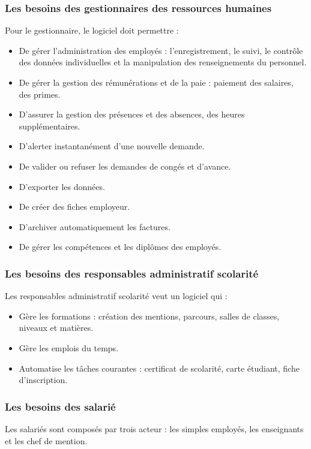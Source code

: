 \subsubsection{Les besoins des gestionnaires des ressources humaines}
Pour le gestionnaire, le logiciel doit permettre :
\begin{itemize}
	\item De gérer l'administration des employés : l'enregistrement, le suivi, le contrôle des données individuelles et la manipulation des renseignements du personnel.
	\item De gérer la gestion des rémunérations et de la paie : paiement des salaires, des primes.
	\item D'assurer la gestion des présences et des absences, des heures supplémentaires.
	\item D'alerter instantanément d'une nouvelle demande.
	\item De valider ou refuser les demandes de congés et d'avance.
	\item D'exporter les données.
	\item De créer des fiches employeur.
	\item D'archiver automatiquement les factures.
	\item De gérer les compétences et les diplômes des employés.
\end{itemize}

\subsubsection{Les besoins des responsables administratif scolarité}
Les responsables administratif scolarité veut un logiciel qui :
\begin{itemize}
	\item Gère les formations : création des mentions, parcours, salles de classes, niveaux et matières.
	\item Gère les emplois du temps.
	\item Automatise les tâches courantes : certificat de scolarité, carte étudiant, fiche d'inscription.
\end{itemize}

\subsubsection{Les besoins des salarié}
Les salariés sont composés par trois acteur : les simples employés, les enseignants et les chef de mention.
\medskip

